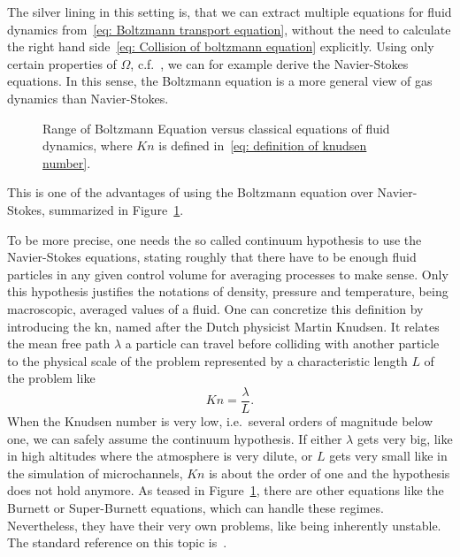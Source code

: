 The silver lining in this setting is, that we can extract multiple equations for fluid dynamics from~\eqref{eq: Boltzmann transport equation}, without the need to calculate the right hand side~\eqref{eq: Collision of boltzmann equation} explicitly.
Using only certain properties of $\Omega$, c.f.~\cite[Pages 26 ff.]{harris2004introduction}, we can for example derive the Navier-Stokes equations.
In this sense, the Boltzmann equation is a more general view of gas dynamics than Navier-Stokes.
\begin{figure}
\centering

\caption{Range of Boltzmann Equation versus classical equations of fluid dynamics, where $Kn$ is defined in~\eqref{eq: definition of knudsen number}.}
\label{fig: boltzmann vs navier stokes}
\end{figure}

This is one of the advantages of using the Boltzmann equation over Navier-Stokes, summarized in Figure~\ref{fig: boltzmann vs navier stokes}.

To be more precise, one needs the so called continuum hypothesis to use the Navier-Stokes equations, stating roughly that there have to be enough fluid particles in any given control volume for averaging processes to make sense.
Only this hypothesis justifies the notations of density, pressure and temperature, being macroscopic, averaged values of a fluid.
One can concretize this definition by introducing the \gls{kn}, named after the Dutch physicist Martin Knudsen.
It relates the mean free path $\lambda$ a particle can travel before colliding with another particle to the physical scale of the problem represented by a characteristic length $L$ of the problem like
\begin{equation}
  \label{eq: definition of knudsen number}
  Kn=\frac{\lambda}{L}.
\end{equation}
When the Knudsen number is very low, i.e.\ several orders of magnitude below one, we can safely assume the continuum hypothesis.
If either $\lambda$ gets very big, like in high altitudes where the atmosphere is very dilute, or $L$ gets very small like in the simulation of microchannels, $Kn$ is about the order of one and the hypothesis does not hold anymore.
As teased in Figure~\ref{fig: boltzmann vs navier stokes}, there are other equations like the Burnett or Super-Burnett equations, which can handle these regimes.
Nevertheless, they have their very own problems, like being inherently unstable.
The standard reference on this topic is~\cite{agarwal2001beyond}.

